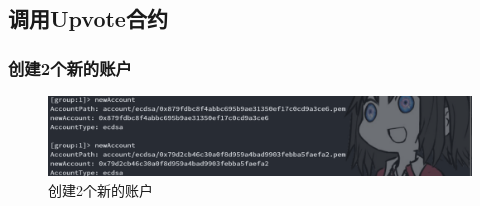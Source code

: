 \documentclass[a4paper, 11pt]{article}
\begin{document}
\subsection{调用Upvote合约}
\subsubsection{创建2个新的账户}
      \begin{figure}[H]
            \centering
            \includegraphics[width = 0.8 \textwidth]{newAccount.png}
            \caption{创建2个新的账户}
      \end{figure}
\end{document}
